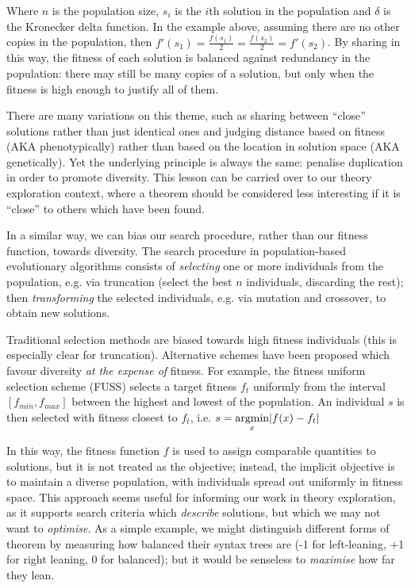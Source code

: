 Where $n$ is the population size, $s_i$ is the $i$th solution in the population and $\delta$ is the Kronecker delta function. In the example above, assuming there are no other copies in the population, then $f'(s_1) = \frac{f(s_1)}{2} = \frac{f(s_2)}{2} = f'(s_2)$. By sharing in this way, the fitness of each solution is balanced against redundancy in the population: there may still be many copies of a solution, but only when the fitness is high enough to justify all of them.

There are many variations on this theme, such as sharing between ``close'' solutions rather than just identical ones and judging distance based on fitness (AKA phenotypically) rather than based on the location in solution space (AKA genetically). Yet the underlying principle is always the same: penalise duplication in order to promote diversity. This lesson can be carried over to our theory exploration context, where a theorem should be considered less interesting if it is ``close'' to others which have been found.

In a similar way, we can bias our search procedure, rather than our fitness function, towards diversity. The search procedure in population-based evolutionary algorithms consists of \emph{selecting} one or more individuals from the population, e.g. via truncation (select the best $n$ individuals, discarding the rest); then \emph{transforming} the selected individuals, e.g. via mutation and crossover, to obtain new solutions.

Traditional selection methods are biased towards high fitness individuals (this is especially clear for truncation). Alternative schemes have been proposed which favour diversity \emph{at the expense of} fitness. For example, the fitness uniform selection scheme (FUSS) \citep{hutter2002fitness} selects a target fitness $f_t$ uniformly from the interval $\left[ f_{min}, f_{max} \right]$ between the highest and lowest of the population. An individual $s$ is then selected with fitness closest to $f_t$, i.e. $s = \argmin\limits_{x} \lvert f(x) - f_t \rvert$

In this way, the fitness function $f$ is used to assign comparable quantities to solutions, but it is not treated as the objective; instead, the implicit objective is to maintain a diverse population, with individuals spread out uniformly in fitness space. This approach seems useful for informing our work in theory exploration, as it supports search criteria which \emph{describe} solutions, but which we may not want to \emph{optimise}. As a simple example, we might distinguish different forms of theorem by measuring how balanced their syntax trees are (-1 for left-leaning, +1 for right leaning, 0 for balanced); but it would be senseless to \emph{maximise} how far they lean.

